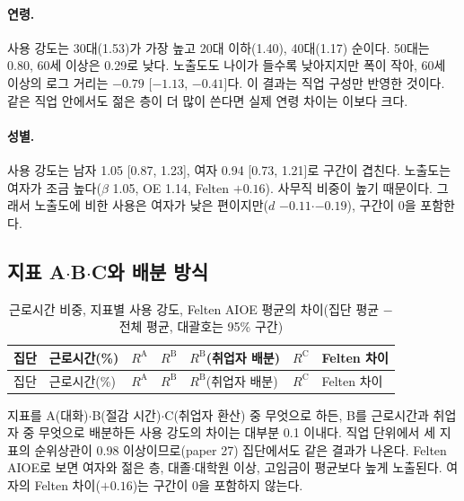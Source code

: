 \documentclass[11pt]{article}
\begin{document}
\paragraph{연령.} 사용 강도는 30대(1.53)가 가장 높고 20대 이하(1.40), 40대(1.17) 순이다. 50대는 0.80, 60세 이상은 0.29로 낮다. 노출도도 나이가 들수록 낮아지지만 폭이 작아, 60세 이상의 로그 거리는 $-0.79$ [$-1.13$, $-0.41$]다. 이 결과는 직업 구성만 반영한 것이다. 같은 직업 안에서도 젊은 층이 더 많이 쓴다면 실제 연령 차이는 이보다 크다.

\paragraph{성별.} 사용 강도는 남자 1.05 [0.87, 1.23], 여자 0.94 [0.73, 1.21]로 구간이 겹친다. 노출도는 여자가 조금 높다($\beta$ 1.05, OE 1.14, Felten $+0.16$). 사무직 비중이 높기 때문이다. 그래서 노출도에 비한 사용은 여자가 낮은 편이지만($d$ $-0.11$$\cdot$$-0.19$), 구간이 0을 포함한다.

\subsection{지표 A$\cdot$B$\cdot$C와 배분 방식}

\begin{small}
\begin{longtable}{L{3.0cm}R{1.8cm}R{1.5cm}R{1.5cm}R{2.4cm}R{1.5cm}R{3.4cm}}
\caption{근로시간 비중, 지표별 사용 강도, Felten AIOE 평균의 차이(집단 평균 $-$ 전체 평균, 대괄호는 95\% 구간)}\label{tab:abc}\\
\toprule
집단 & 근로시간(\%) & $R^{\mathrm{A}}$ & $R^{\mathrm{B}}$ & $R^{\mathrm{B}}$(취업자 배분) & $R^{\mathrm{C}}$ & Felten 차이 \\
\midrule
\endfirsthead
\toprule
집단 & 근로시간(\%) & $R^{\mathrm{A}}$ & $R^{\mathrm{B}}$ & $R^{\mathrm{B}}$(취업자 배분) & $R^{\mathrm{C}}$ & Felten 차이 \\
\midrule
\endhead

\bottomrule
\end{longtable}
\end{small}

지표를 A(대화)$\cdot$B(절감 시간)$\cdot$C(취업자 환산) 중 무엇으로 하든, B를 근로시간과 취업자 중 무엇으로 배분하든 사용 강도의 차이는 대부분 0.1 이내다. 직업 단위에서 세 지표의 순위상관이 0.98 이상이므로(paper 27) 집단에서도 같은 결과가 나온다. Felten AIOE로 보면 여자와 젊은 층, 대졸$\cdot$대학원 이상, 고임금이 평균보다 높게 노출된다. 여자의 Felten 차이($+0.16$)는 구간이 0을 포함하지 않는다.
\end{document}
